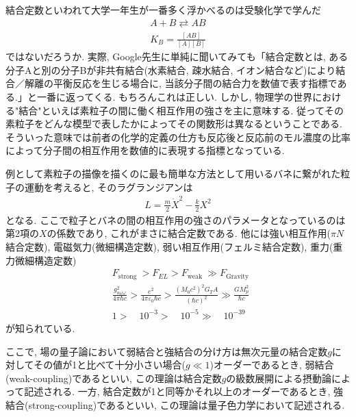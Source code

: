 \documentclass[dvipdfmx,11pt,a4paper,oneside,openany]{jsbook}
\begin{document}
結合定数といわれて大学一年生が一番多く浮かべるのは受験化学で学んだ
\setcounter{equation}{0}
\begin{align*}
    A+B \rightleftarrows A B \\
    K_{B}=\frac{[A B]}{[A][B]}
\end{align*}
ではないだろうか. 実際, Google先生に単純に聞いてみても「結合定数とは, ある分子Aと別の分子Bが非共有結合(水素結合, 疎水結合, イオン結合など)により結合／解離の平衡反応を生じる場合に, 当該分子間の結合力を数値で表す指標である.」と一番に返ってくる. もちろんこれは正しい. しかし, 物理学の世界における"結合"といえば素粒子の間に働く相互作用の強さを主に意味する. 従ってその素粒子をどんな模型で表したかによってその関数形は異なるということである. そういった意味では前者の化学的定義の仕方も反応後と反応前のモル濃度の比率によって分子間の相互作用を数値的に表現する指標となっている.

例として素粒子の描像を描くのに最も簡単な方法として用いるバネに繋がれた粒子の運動を考えると, そのラグランジアンは
\begin{align*}
    L=\frac{m}{2} \dot{X}^{2}-\frac{k}{2} X^{2}
\end{align*}
となる. ここで粒子とバネの間の相互作用の強さのパラメータとなっているのは第2項の$X$の係数であり, これがまさに結合定数である. 他には強い相互作用($\pi N$結合定数), 電磁気力(微細構造定数), 弱い相互作用(フェルミ結合定数), 重力(重力微細構造定数)
\begin{align*}
     & F_{\text {strong }}>F_{E L}>F_{\text {weak }}  \gg F_{\text {Gravity }}                                                                                                                \\
     & \frac{g_{n \omega \omega}^{2}}{4 \pi \hbar c}> \frac{e^{2}}{4 \pi \varepsilon_{0} \hbar c}> \frac{\left(M_{0} c^{2}\right)^{2} G_{T}{A}}{(\hbar c)^{2}}\gg \frac{G M_{p}^{2}}{\hbar c} \\
     & 1> \quad 10^{-3}> \quad 10^{-5}\gg \quad 10^{-39}
\end{align*}
が知られている.

ここで, 場の量子論において弱結合と強結合の分け方は無次元量の結合定数$g$に対してその値が1と比べて十分小さい場合($g\ll 1$)オーダーであるとき, 弱結合(weak-coupling)であるといい, この理論は結合定数$g$の級数展開による摂動論によって記述される. 一方, 結合定数が1と同等かそれ以上のオーダーであるとき, 強結合(strong-coupling)であるといい, この理論は量子色力学において記述される.
\end{document}
